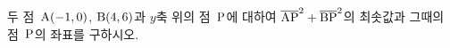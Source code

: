 두 점~$\mathrm{A}(-1{,}\mkern3mu\mathopen{}0)$, $\mathrm{B}(4{,}\mkern3mu\mathopen{}6)$과 $y$축 위의 점~$\mathrm{P}$에 대하여 $\overline{\mathrm{AP}}^2+\overline{\mathrm{BP}}^2$의 최솟값과 그때의 점~$\mathrm{P}$의 좌표를 구하시오.
